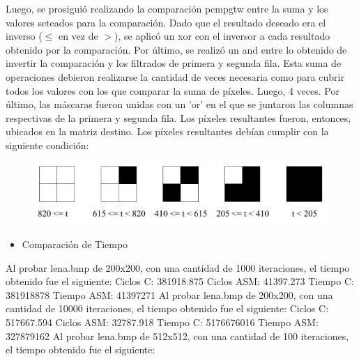 \documentclass[10pt, a4paper]{article}
\begin{document}
\begin{itemize}
Luego, se prosiguió realizando la comparación pcmpgtw entre la suma y los valores seteados para la comparación. Dado que el resultado deseado era el inverso ($\leq$ en vez de $>$), se aplicó un xor con el inversor a cada resultado obtenido por la comparación. Por último, se realizó un and entre lo obtenido de invertir la comparación y los filtrados de primera y segunda fila. Esta suma de operaciones debieron realizarse la cantidad de veces necesaria como para cubrir todos los valores con los que comparar la suma de píxeles. Luego, 4 veces. Por último, las máscaras fueron unidas con un 'or' en el que se juntaron las columnas respectivas de la primera y segunda fila. Los píxeles resultantes fueron, entonces, ubicados en la matriz destino.\newline
Los píxeles resultantes debían cumplir con la siguiente condición:
\begin{figure}[H] %
\begin{center}
\includegraphics[width=400pt]{./halftone.jpg}
\end{center}
\end{figure}

\begin{itemize}
\item{Comparación de Tiempo}
\end{itemize}

Al probar lena.bmp de 200x200, con una cantidad de 1000 iteraciones, el tiempo obtenido fue el siguiente:\newline
Ciclos C:                 381918.875\newline
Ciclos ASM:               41397.273\newline
\newline
Tiempo C:                 381918878\newline
Tiempo ASM:               41397271\newline
\newline
Al probar lena.bmp de 200x200, con una cantidad de 10000 iteraciones, el tiempo obtenido fue el siguiente:\newline
Ciclos C:                 517667.594\newline
Ciclos ASM:               32787.918\newline
\newline
Tiempo C:                 5176676016\newline
Tiempo ASM:               327879162\newline
\newline
Al probar lena.bmp de 512x512, con una cantidad de 100 iteraciones, el tiempo obtenido fue el siguiente:\newline


\end{itemize}
\end{document}
